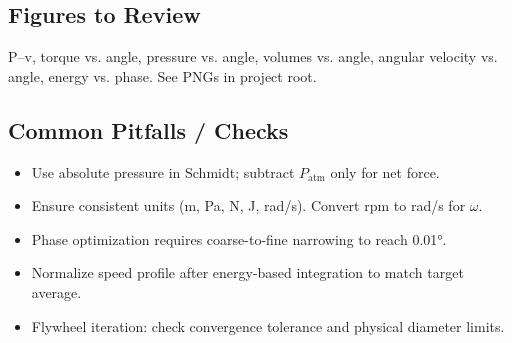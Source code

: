 \documentclass[11pt]{article}
\begin{document}
\subsection*{Figures to Review}
P–v, torque vs. angle, pressure vs. angle, volumes vs. angle, angular velocity vs. angle, energy vs. phase. See PNGs in project root.

\subsection*{Common Pitfalls / Checks}
\begin{itemize}
  \item Use absolute pressure in Schmidt; subtract $P_{\text{atm}}$ only for net force.
  \item Ensure consistent units (m, Pa, N, J, rad/s). Convert rpm to rad/s for $\omega$.
  \item Phase optimization requires coarse-to-fine narrowing to reach \ang{0.01}.
  \item Normalize speed profile after energy-based integration to match target average.
  \item Flywheel iteration: check convergence tolerance and physical diameter limits.
\end{itemize}
\end{document}
